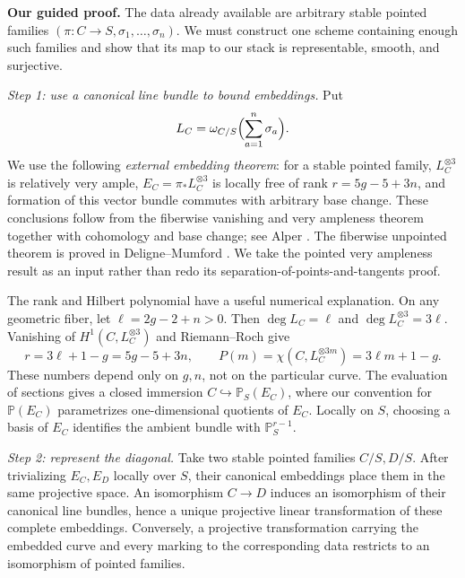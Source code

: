 \medskip
\noindent\textbf{Our guided proof.}
The data already available are arbitrary stable pointed families
$(\pi:C\to S,\sigma_1,\ldots,\sigma_n)$. We must construct one
scheme containing enough such families and show that its map to
our stack is representable, smooth, and surjective.

\smallskip
\noindent\emph{Step 1: use a canonical line bundle to bound embeddings.}
Put
\[
 L_C=\omega_{C/S}\Bigl(\sum_{a=1}^n\sigma_a\Bigr).
\]
We use the following \emph{external embedding theorem}: for a stable
pointed family, $L_C^{\otimes3}$ is relatively very ample,
$E_C=\pi_*L_C^{\otimes3}$ is locally free of rank $r=5g-5+3n$,
and formation of this vector bundle commutes with arbitrary base
change. These conclusions follow from the fiberwise vanishing and
very ampleness theorem together with cohomology and base change;
see Alper \cite[Exercise 6.3.18 and Proposition 6.3.23,
pp.~230--231]{Alper}. The fiberwise unpointed theorem is proved in
Deligne--Mumford \cite[Theorem (1.2) and its corollary,
pp.~77--78]{DM}. We take the pointed very ampleness result as an
input rather than redo its separation-of-points-and-tangents proof.

The rank and Hilbert polynomial have a useful numerical explanation.
On any geometric fiber, let $\ell=2g-2+n>0$. Then
$\deg L_C=\ell$ and $\deg L_C^{\otimes3}=3\ell$. Vanishing of
$H^1(C,L_C^{\otimes3})$ and Riemann--Roch give
\[
 r=3\ell+1-g=5g-5+3n,
 \qquad P(m)=\chi(C,L_C^{\otimes3m})=3\ell m+1-g.
\]
These numbers depend only on $g,n$, not on the particular curve.
The evaluation of sections gives a closed immersion
$C\hookrightarrow\mathbb P_S(E_C)$, where our convention for
$\mathbb P(E_C)$ parametrizes one-dimensional quotients of $E_C$.
Locally on $S$, choosing a basis of $E_C$ identifies the ambient
bundle with $\mathbb P^{r-1}_S$.

\smallskip
\noindent\emph{Step 2: represent the diagonal.}
Take two stable pointed families $C/S,D/S$. After trivializing
$E_C,E_D$ locally over $S$, their canonical embeddings place them
in the same projective space. An isomorphism $C\to D$ induces an
isomorphism of their canonical line bundles, hence a unique
projective linear transformation of these complete embeddings.
Conversely, a projective transformation carrying the embedded
curve and every marking to the corresponding data restricts to
an isomorphism of pointed families.

